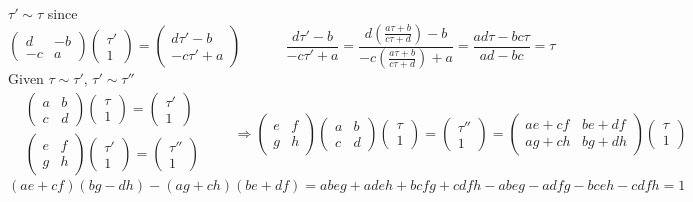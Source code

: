 \documentclass[twoside]{amsart}
\begin{document}
$\tau' \sim \tau$ since 
\[
\left( \begin{matrix} d & -b \\ -c & a \end{matrix} \right) \left( \begin{matrix} \tau' \\ 1 \end{matrix} \right) = \left( \begin{matrix} d\tau' - b  \\ -c\tau' + a \end{matrix} \right) \quad \quad \quad \, \frac{ d \tau' - b }{ -c\tau' + a } = \frac{ d \left( \frac{ a \tau + b }{ c\tau + d } \right) - b }{ -c \left( \frac{ a\tau + b }{ c\tau + d } \right) + a } = \frac{ ad \tau - bc \tau }{ ad-bc } = \tau 
\]
Given $\tau \sim \tau'$, $\tau' \sim \tau''$
\[
\begin{aligned}
  & \left( \begin{matrix} a & b \\ c & d \end{matrix} \right) \left( \begin{matrix} \tau \\ 1 \end{matrix} \right) = \left( \begin{matrix} \tau' \\ 1 \end{matrix} \right) \\ 
  & \left( \begin{matrix} e & f \\ g & h \end{matrix} \right) \left( \begin{matrix} \tau' \\ 1 \end{matrix} \right) = \left( \begin{matrix} \tau'' \\ 1 \end{matrix} \right) 
\end{aligned} \quad \quad \Longrightarrow \left( \begin{matrix} e & f \\ g & h \end{matrix} \right) \left( \begin{matrix} a & b \\ c & d \end{matrix} \right) \left( \begin{matrix} \tau \\ 1 \end{matrix} \right) = \left( \begin{matrix} \tau'' \\ 1 \end{matrix} \right) = \left( \begin{matrix} a e + cf & be + df \\ ag + ch & bg + d h \end{matrix} \right) \left( \begin{matrix} \tau \\ 1 \end{matrix} \right) 
\]
\[
(ae + cf) (bg - dh) - (ag+ch) (be +df) = abeg + adeh + bcfg + cdfh - abeg - adfg - bceh - cdfh = 1 
\]
\end{document}
